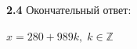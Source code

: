 \documentclass[12pt]{article}
\begin{document}
\begin{flushleft}
        \hspace{1.25cm}\textbf{2.4} Окончательный ответ:
        \begin{center}
            $ x = 280 + 989k, \; k \in \mathbb{Z}  $ \\
        \end{center}

\end{flushleft}
\end{document}

